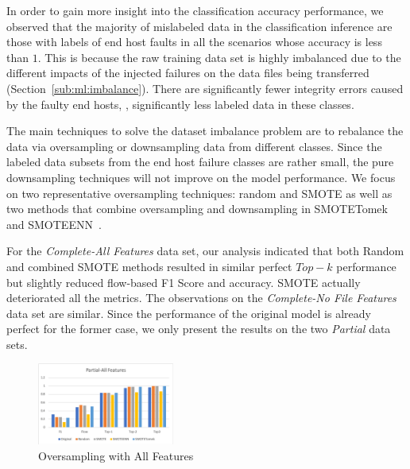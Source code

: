 In order to gain more insight into the classification accuracy performance, we observed that the majority of mislabeled data in the classification inference are those with labels of end host faults in all the scenarios whose accuracy is less than $1$.  This is because the raw training data set is highly imbalanced due to the different impacts of the injected failures on the data files being transferred (Section~\ref{sub:ml:imbalance}). There are significantly fewer integrity errors caused by the faulty end hosts, \ie, significantly less labeled data in these classes. 

The main techniques to solve the dataset imbalance problem are to rebalance the data via oversampling or downsampling data from different classes. Since the labeled data subsets from the end host failure classes are rather small, the pure downsampling techniques will not improve on the model performance. We focus on two representative oversampling techniques: random and SMOTE as well as two methods that combine oversampling and downsampling in SMOTETomek and SMOTEENN~\cite{imbalance-learn:web}.

For the  {\it Complete-All Features} data set, our analysis indicated that both Random and combined SMOTE methods resulted in similar perfect $Top-k$ performance but slightly reduced flow-based F1 Score and accuracy. SMOTE actually deteriorated all the metrics. The observations on the  {\it Complete-No File Features} data set are similar. Since the performance of the original model is already perfect for the former case, we only present the results on the two {\it Partial} data sets.

\begin{figure}[!ht]
\begin{center}
\includegraphics[width=0.4\textwidth]{./figure/partial-all-oversampling}
\end{center}
\caption{Oversampling with All Features}
\label{fig:os:all}
\end{figure}

